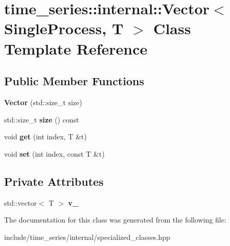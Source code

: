 \hypertarget{classtime__series_1_1internal_1_1Vector_3_01SingleProcess_00_01T_01_4}{}\section{time\+\_\+series\+:\+:internal\+:\+:Vector$<$ Single\+Process, T $>$ Class Template Reference}
\label{classtime__series_1_1internal_1_1Vector_3_01SingleProcess_00_01T_01_4}
\subsection*{Public Member Functions}
\begin{DoxyCompactItemize}
\item 
{\bfseries Vector} (std\+::size\+\_\+t size)\hypertarget{classtime__series_1_1internal_1_1Vector_3_01SingleProcess_00_01T_01_4_aa098f4f87f80ef5238777a1b2f1ed761}{}\label{classtime__series_1_1internal_1_1Vector_3_01SingleProcess_00_01T_01_4_aa098f4f87f80ef5238777a1b2f1ed761}

\item 
std\+::size\+\_\+t {\bfseries size} () const \hypertarget{classtime__series_1_1internal_1_1Vector_3_01SingleProcess_00_01T_01_4_a697e03e1e9e8da567fc520dd55aae42f}{}\label{classtime__series_1_1internal_1_1Vector_3_01SingleProcess_00_01T_01_4_a697e03e1e9e8da567fc520dd55aae42f}

\item 
void {\bfseries get} (int index, T \&t)\hypertarget{classtime__series_1_1internal_1_1Vector_3_01SingleProcess_00_01T_01_4_a62c2a28b1f3a2a1807526741a6d446fa}{}\label{classtime__series_1_1internal_1_1Vector_3_01SingleProcess_00_01T_01_4_a62c2a28b1f3a2a1807526741a6d446fa}

\item 
void {\bfseries set} (int index, const T \&t)\hypertarget{classtime__series_1_1internal_1_1Vector_3_01SingleProcess_00_01T_01_4_a42eba57809b83e3d38f1afa5e0ca2025}{}\label{classtime__series_1_1internal_1_1Vector_3_01SingleProcess_00_01T_01_4_a42eba57809b83e3d38f1afa5e0ca2025}

\end{DoxyCompactItemize}
\subsection*{Private Attributes}
\begin{DoxyCompactItemize}
\item 
std\+::vector$<$ T $>$ {\bfseries v\+\_\+}\hypertarget{classtime__series_1_1internal_1_1Vector_3_01SingleProcess_00_01T_01_4_aae291cb7013fed36911dafaabb09978b}{}\label{classtime__series_1_1internal_1_1Vector_3_01SingleProcess_00_01T_01_4_aae291cb7013fed36911dafaabb09978b}

\end{DoxyCompactItemize}


The documentation for this class was generated from the following file\+:\begin{DoxyCompactItemize}
\item 
include/time\+\_\+series/internal/specialized\+\_\+classes.\+hpp\end{DoxyCompactItemize}
